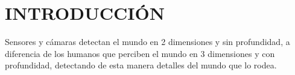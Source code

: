 \documentclass[10pt,letterpaper]{article}
\begin{document}


%        
%	        
%	        
%		    
%		    
%		    
%		
%		
%        

\tableofcontents
\newpage
\listoffigures
\newpage
\listoftables
\printindex

\newpage
\section{INTRODUCCIÓN}
Sensores y cámaras detectan el mundo en 2 dimensiones y sin profundidad, a diferencia de los humanos que perciben el mundo en 3 dimensiones y con profundidad, detectando de esta manera detalles del mundo que lo rodea.
\end{document}
